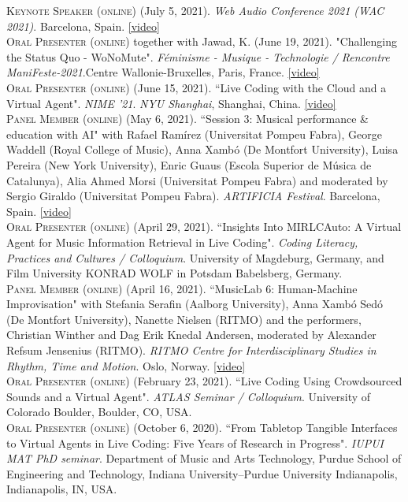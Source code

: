 \documentclass[10pt, a4paper]{article}
\newcommand{\years}[1]{\marginnote{\scriptsize #1}}
\begin{document}
{\years{2021f} \textsc{Keynote Speaker (online)} (July 5, 2021). \emph{Web Audio Conference 2021 (WAC 2021)}. Barcelona, Spain. \href{https://youtu.be/7SWu3txbg-w}{[video]}\\ 
\years{2021f} \textsc{Oral Presenter (online)} together with Jawad, K.  (June 19, 2021). "Challenging the Status Quo - WoNoMute". \emph{Féminisme - Musique - Technologie / Rencontre ManiFeste-2021}.Centre Wallonie-Bruxelles, Paris, France. \href{https://youtu.be/jXmNvd9ty_o}{[video]}\\
\years{2021e} \textsc{Oral Presenter (online)} (June 15, 2021). “Live Coding with the Cloud and a Virtual Agent". \emph{NIME '21}. 
\emph{NYU Shanghai}, Shanghai, China. \href{https://youtu.be/F4UoH1hRMoU}{[video]}\\
\years{2021d} \textsc{Panel Member (online)} (May 6, 2021). “Session 3: Musical performance \& education with AI" with Rafael Ramírez (Universitat Pompeu Fabra), George Waddell (Royal College of Music), Anna Xambó (De Montfort University), Luisa Pereira (New York University), Enric Guaus (Escola Superior de Música de Catalunya), Alia Ahmed Morsi (Universitat Pompeu Fabra) and moderated by Sergio Giraldo (Universitat Pompeu Fabra). \emph{ARTIFICIA Festival}. Barcelona, Spain. \href{https://youtu.be/o0arHV4s6Mo}{[video]}\\ 
\years{2021c} \textsc{Oral Presenter (online)} (April 29, 2021). “Insights Into MIRLCAuto: A Virtual Agent for Music Information Retrieval in Live Coding". \emph{Coding Literacy, Practices and Cultures / Colloquium}. University of Magdeburg, Germany, and Film University KONRAD WOLF in Potsdam Babelsberg, Germany.\\ 
\years{2021b} \textsc{Panel Member (online)} (April 16, 2021). “MusicLab 6: Human-Machine Improvisation" with Stefania Serafin (Aalborg University), Anna Xambó Sedó (De Montfort University), Nanette Nielsen (RITMO) and the performers, Christian Winther and Dag Erik Knedal Andersen, moderated by Alexander Refsum Jensenius (RITMO). \emph{RITMO Centre for Interdisciplinary Studies in Rhythm, Time and Motion}. Oslo, Norway. \href{https://youtu.be/yeIRxkm-kSc}{[video]}\\ 
\years{2021a} \textsc{Oral Presenter (online)} (February 23, 2021). “Live Coding Using Crowdsourced Sounds and a Virtual Agent". \emph{ATLAS Seminar / Colloquium}. University of Colorado Boulder, Boulder, CO, USA.\\ 
\years{2020c} \textsc{Oral Presenter (online)} (October 6, 2020). “From Tabletop Tangible Interfaces to Virtual Agents in Live Coding: Five Years of Research in Progress". \emph{IUPUI MAT PhD seminar}. Department of Music and Arts Technology, Purdue School of Engineering and Technology, Indiana University--Purdue University Indianapolis, Indianapolis, IN, USA.\\ 
}
\end{document}
